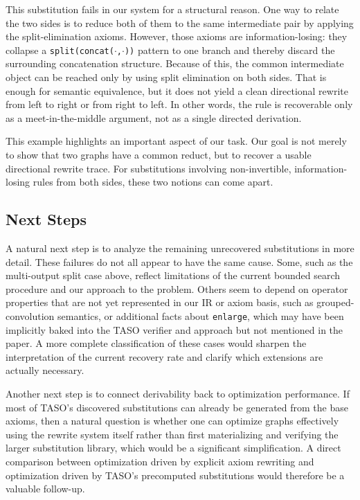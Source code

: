 \documentclass[sigplan,10pt,nonacm]{acmart}
\begin{document}
This substitution fails in our system for a structural reason. One way to relate the two sides is to reduce both of them to the same intermediate pair by applying the split-elimination axioms. However, those axioms are information-losing: they collapse a \texttt{split(concat(\(\cdot\),\(\cdot\)))} pattern to one branch and thereby discard the surrounding concatenation structure. Because of this, the common intermediate object can be reached only by using split elimination on both sides. That is enough for semantic equivalence, but it does not yield a clean directional rewrite from left to right or from right to left. In other words, the rule is recoverable only as a meet-in-the-middle argument, not as a single directed derivation.

This example highlights an important aspect of our task. Our goal is not merely to show that two graphs have a common reduct, but to recover a usable directional rewrite trace. For substitutions involving non-invertible, information-losing rules from both sides, these two notions can come apart. 


\subsection{Next Steps}

A natural next step is to analyze the remaining unrecovered substitutions in more detail. These failures do not all appear to have the same cause. Some, such as the multi-output split case above, reflect limitations of the current bounded search procedure and our approach to the problem. Others seem to depend on operator properties that are not yet represented in our IR or axiom basis, such as grouped-convolution semantics, or additional facts about \texttt{enlarge}, which may have been implicitly baked into the TASO verifier and approach but not mentioned in the paper. A more complete classification of these cases would sharpen the interpretation of the current recovery rate and clarify which extensions are actually necessary.

Another next step is to connect derivability back to optimization performance. If most of TASO's discovered substitutions can already be generated from the base axioms, then a natural question is whether one can optimize graphs effectively using the rewrite system itself rather than first materializing and verifying the larger substitution library, which would be a significant simplification. A direct comparison between optimization driven by explicit axiom rewriting and optimization driven by TASO's precomputed substitutions would therefore be a valuable follow-up.


\newpage


\end{document}
